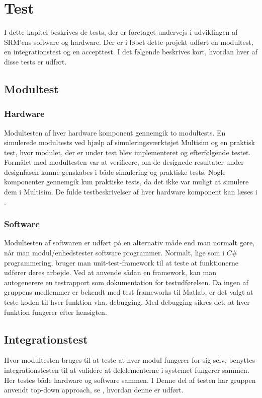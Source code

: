 \chapter{Test}

I dette kapitel beskrives de tests, der er foretaget undervejs i udviklingen af SRM'ens software og hardware. Der er i løbet dette projekt udført en modultest, en integrationstest og en accepttest. I det følgende beskrives kort, hvordan hver af disse tests er udført. 


\section{Modultest} 
\subsection{Hardware}
Modultesten af hver hardware komponent gennemgik to modultests. En simulerede modultests ved hjælp af simuleringsværktøjet Multisim og en praktisk test, hvor modulet, der er under test blev implementeret og efterfølgende testet. Formålet med modultesten var at verificere, om de designede resultater under designfasen kunne genskabes i både simulering og praktiske tests. Nogle komponenter gennemgik kun praktiske tests, da det ikke var muligt at simulere dem i Multisim. De fulde testbeskrivelser af hver hardware komponent kan læses i . 
\subsection{Software}
Modultesten af softwaren er udført på en alternativ måde end man normalt gøre, når man modul/enhedstester software programmer. Normalt, lige som i $C\#$ programmering, bruger man unit-test-framework til at teste at funktionerne udfører deres arbejde. Ved at anvende sådan en framework, kan man autogenerere en testrapport som dokumentation for testudførelsen. Da ingen af gruppens medlemmer er bekendt med test frameworks til Matlab, er det valgt at teste koden til hver funktion vha. debugging. Med debugging sikres det, at hver funktion fungerer efter hensigten.


\section{Integrationstest}
Hvor modultesten bruges til at teste at hver modul fungerer for sig selv, benyttes integrationstesten til at validere at delelementerne i systemet fungerer sammen. Her testes både hardware og software sammen.  I Denne del af testen har gruppen anvendt top-down approach, se , hvordan denne er udført.  

